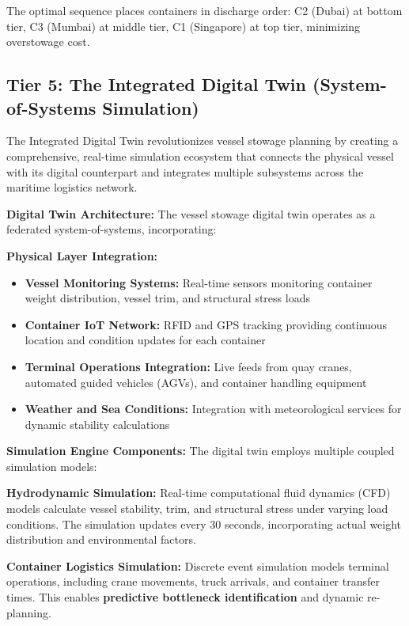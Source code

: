 \documentclass{article}
\begin{document}
The optimal sequence places containers in discharge order: C2 (Dubai) at bottom tier, C3 (Mumbai) at middle tier, C1 (Singapore) at top tier, minimizing overstowage cost.

\subsection{Tier 5: The Integrated Digital Twin (System-of-Systems Simulation)}

The Integrated Digital Twin revolutionizes vessel stowage planning by creating a comprehensive, real-time simulation ecosystem that connects the physical vessel with its digital counterpart and integrates multiple subsystems across the maritime logistics network.

\textbf{Digital Twin Architecture:}
The vessel stowage digital twin operates as a federated system-of-systems, incorporating:

\textbf{Physical Layer Integration:}
\begin{itemize}
\item \textbf{Vessel Monitoring Systems:} Real-time sensors monitoring container weight distribution, vessel trim, and structural stress loads
\item \textbf{Container IoT Network:} RFID and GPS tracking providing continuous location and condition updates for each container
\item \textbf{Terminal Operations Integration:} Live feeds from quay cranes, automated guided vehicles (AGVs), and container handling equipment
\item \textbf{Weather and Sea Conditions:} Integration with meteorological services for dynamic stability calculations
\end{itemize}

\textbf{Simulation Engine Components:}
The digital twin employs multiple coupled simulation models:

\textbf{Hydrodynamic Simulation:} Real-time computational fluid dynamics (CFD) models calculate vessel stability, trim, and structural stress under varying load conditions. The simulation updates every 30 seconds, incorporating actual weight distribution and environmental factors.

\textbf{Container Logistics Simulation:} Discrete event simulation models terminal operations, including crane movements, truck arrivals, and container transfer times. This enables \textbf{predictive bottleneck identification} and dynamic re-planning.
\end{document}
